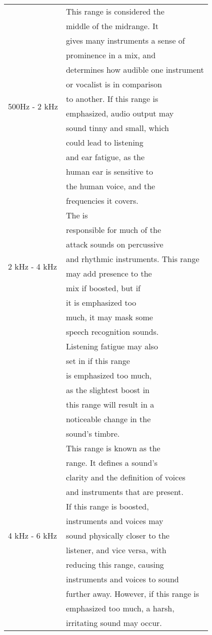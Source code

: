 \begin{longtable}[h!]{| l | l|}
		\hline
		\multirow{14}{*}{500Hz - 2 kHz} & This range is considered the \\ & middle of the midrange. It \\ & gives many instruments a sense of \\ & prominence in a mix, and \\ & determines how audible one instrument \\ & or vocalist is in comparison \\ & to another. If this range is \\ & emphasized, audio output may \\ & sound tinny and small, which \\ & could lead to listening \\ & and ear fatigue, as the \\ & human ear is sensitive to \\ & the human voice, and the \\ & frequencies it covers. \\ 
		\hline
		\multirow{8}{*}{2 kHz - 4 kHz} & The \say{upper midrange} is \\ & responsible for much of the \\ & attack sounds on percussive \\ & and rhythmic instruments. This range \\ & may add presence to the \\ & mix if boosted, but if \\ & it is emphasized too \\ & much, it may mask some \\ & speech recognition sounds. \\ & Listening fatigue may also \\ & set in if this range \\ & is emphasized too much, \\ & as the slightest boost in \\ & this range will result in a \\ & noticeable change in the \\ & sound's timbre. \\ 
		\hline
		\multirow{13}{*}{4 kHz - 6 kHz} & This range is known as the \\ & \say{presence} range. It defines a sound's \\ & clarity and the definition of voices \\ & and instruments that are present. \\ & If this range is boosted, \\ & instruments and voices may \\ & sound physically closer to the \\ & listener, and vice versa, with \\ & reducing this range, causing \\ & instruments and voices to sound \\ & further away. However, if this range is \\ & emphasized too much, a harsh, \\ & irritating sound may occur. \\

\end{longtable}
